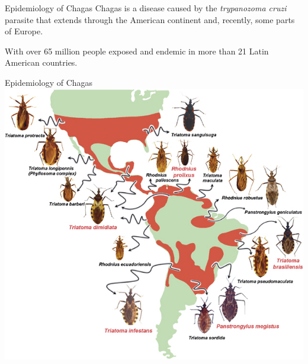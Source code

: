 \documentclass{beamer}
\begin{document}

\begin{frame}{Epidemiology of Chagas}
			Chagas is a disease caused by the \textit{trypanozoma cruzi} parasite
			 that extends through the American continent and, recently, some parts of Europe.
			
			\medskip  With over 65 million people exposed and endemic in more than 21 Latin American countries.
\end{frame}

\begin{frame}{Epidemiology of Chagas}		
			\includegraphics[height=.9\textheight]{slides/triatomine-map.jpg}
\end{frame}
\end{document}
